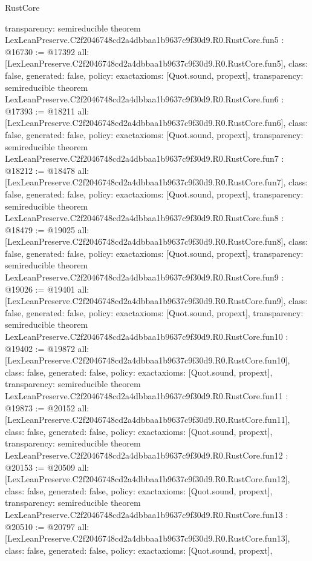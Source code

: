\begin{lexlean}{RustCore}
\begin{coremodule}
{  transparency: semireducible
}
theorem LexLeanPreserve.C2f2046748cd2a4dbbaa1b9637c9f30d9.R0.RustCore.fun5 : @16730 := @17392 {
  all: [LexLeanPreserve.C2f2046748cd2a4dbbaa1b9637c9f30d9.R0.RustCore.fun5],
  class: false,
  generated: false,
  policy: exact{axioms: [Quot.sound, propext]},
  transparency: semireducible
}
theorem LexLeanPreserve.C2f2046748cd2a4dbbaa1b9637c9f30d9.R0.RustCore.fun6 : @17393 := @18211 {
  all: [LexLeanPreserve.C2f2046748cd2a4dbbaa1b9637c9f30d9.R0.RustCore.fun6],
  class: false,
  generated: false,
  policy: exact{axioms: [Quot.sound, propext]},
  transparency: semireducible
}
theorem LexLeanPreserve.C2f2046748cd2a4dbbaa1b9637c9f30d9.R0.RustCore.fun7 : @18212 := @18478 {
  all: [LexLeanPreserve.C2f2046748cd2a4dbbaa1b9637c9f30d9.R0.RustCore.fun7],
  class: false,
  generated: false,
  policy: exact{axioms: [Quot.sound, propext]},
  transparency: semireducible
}
theorem LexLeanPreserve.C2f2046748cd2a4dbbaa1b9637c9f30d9.R0.RustCore.fun8 : @18479 := @19025 {
  all: [LexLeanPreserve.C2f2046748cd2a4dbbaa1b9637c9f30d9.R0.RustCore.fun8],
  class: false,
  generated: false,
  policy: exact{axioms: [Quot.sound, propext]},
  transparency: semireducible
}
theorem LexLeanPreserve.C2f2046748cd2a4dbbaa1b9637c9f30d9.R0.RustCore.fun9 : @19026 := @19401 {
  all: [LexLeanPreserve.C2f2046748cd2a4dbbaa1b9637c9f30d9.R0.RustCore.fun9],
  class: false,
  generated: false,
  policy: exact{axioms: [Quot.sound, propext]},
  transparency: semireducible
}
theorem LexLeanPreserve.C2f2046748cd2a4dbbaa1b9637c9f30d9.R0.RustCore.fun10 : @19402 := @19872 {
  all: [LexLeanPreserve.C2f2046748cd2a4dbbaa1b9637c9f30d9.R0.RustCore.fun10],
  class: false,
  generated: false,
  policy: exact{axioms: [Quot.sound, propext]},
  transparency: semireducible
}
theorem LexLeanPreserve.C2f2046748cd2a4dbbaa1b9637c9f30d9.R0.RustCore.fun11 : @19873 := @20152 {
  all: [LexLeanPreserve.C2f2046748cd2a4dbbaa1b9637c9f30d9.R0.RustCore.fun11],
  class: false,
  generated: false,
  policy: exact{axioms: [Quot.sound, propext]},
  transparency: semireducible
}
theorem LexLeanPreserve.C2f2046748cd2a4dbbaa1b9637c9f30d9.R0.RustCore.fun12 : @20153 := @20509 {
  all: [LexLeanPreserve.C2f2046748cd2a4dbbaa1b9637c9f30d9.R0.RustCore.fun12],
  class: false,
  generated: false,
  policy: exact{axioms: [Quot.sound, propext]},
  transparency: semireducible
}
theorem LexLeanPreserve.C2f2046748cd2a4dbbaa1b9637c9f30d9.R0.RustCore.fun13 : @20510 := @20797 {
  all: [LexLeanPreserve.C2f2046748cd2a4dbbaa1b9637c9f30d9.R0.RustCore.fun13],
  class: false,
  generated: false,
  policy: exact{axioms: [Quot.sound, propext]},
}
\end{coremodule}
\end{lexlean}
